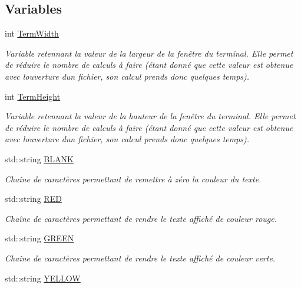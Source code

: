\subsection*{Variables}
\begin{DoxyCompactItemize}
\item 
int \hyperlink{namespaceio_a09b19ec88fb58a6086ca54be52b7bc08}{Term\+Width}
\begin{DoxyCompactList}\small\item\em Variable retennant la valeur de la largeur de la fenêtre du terminal. Elle permet de réduire le nombre de calculs à faire (étant donné que cette valeur est obtenue avec l\textquotesingle{}ouverture d\textquotesingle{}un fichier, son calcul prends donc quelques temps). \end{DoxyCompactList}\item 
int \hyperlink{namespaceio_afaeef00a45e14dc7227025fa7fd27240}{Term\+Height}
\begin{DoxyCompactList}\small\item\em Variable retennant la valeur de la hauteur de la fenêtre du terminal. Elle permet de réduire le nombre de calculs à faire (étant donné que cette valeur est obtenue avec l\textquotesingle{}ouverture d\textquotesingle{}un fichier, son calcul prends donc quelques temps). \end{DoxyCompactList}\item 
std\+::string \hyperlink{namespaceio_a24918bdd47093eb3f11b694ad6f832d4}{B\+L\+A\+NK}
\begin{DoxyCompactList}\small\item\em Chaîne de caractères permettant de remettre à zéro la couleur du texte. \end{DoxyCompactList}\item 
std\+::string \hyperlink{namespaceio_ac9181eea4e6d57e5481bc7e5822de4cb}{R\+ED}
\begin{DoxyCompactList}\small\item\em Chaîne de caractères permettant de rendre le texte affiché de couleur rouge. \end{DoxyCompactList}\item 
std\+::string \hyperlink{namespaceio_a38fffa22831731f5fc0b72700dc75c87}{G\+R\+E\+EN}
\begin{DoxyCompactList}\small\item\em Chaîne de caractères permettant de rendre le texte affiché de couleur verte. \end{DoxyCompactList}\item 
std\+::string \hyperlink{namespaceio_a0bb7c89e9e48840601811e4e35421767}{Y\+E\+L\+L\+OW}

\end{DoxyCompactItemize}
